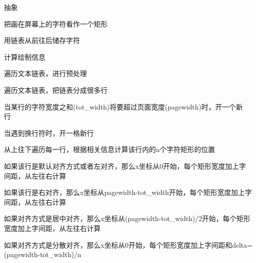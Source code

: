 \begin{DoxyEnumerate}
\item 抽象~\newline

\begin{DoxyItemize}
\item 把画在屏幕上的字符看作一个矩形~\newline

\item 用链表从前往后储存字符~\newline

\end{DoxyItemize}
\item 计算绘制信息~\newline

\begin{DoxyItemize}
\item 遍历文本链表，进行预处理~\newline

\item 遍历文本链表，把链表分成很多行~\newline

\begin{DoxyItemize}
\item 当某行的字符宽度之和({\ttfamily tot\+\_\+width})将要超过页面宽度({\ttfamily pagewidth})时，开一个新行~\newline

\item 当遇到换行符时，开一格新行~\newline

\end{DoxyItemize}
\item 从上往下遍历每一行，根据相关信息计算该行内的{\ttfamily n}个字符矩形的位置~\newline

\begin{DoxyItemize}
\item 如果该行是默认对齐方式或者左对齐，那么x坐标从0开始，每个矩形宽度加上字间距，从左往右计算~\newline

\item 如果该行是右对齐，那么x坐标从{\ttfamily pagewidth}-\/{\ttfamily tot\+\_\+width}开始，每个矩形宽度加上字间距，从左往右计算~\newline

\item 如果对齐方式是居中对齐，那么x坐标从({\ttfamily pagewidth}-\/{\ttfamily tot\+\_\+width})/2开始，每个矩形宽度加上字间距，从左往右计算~\newline

\item 如果对齐方式是分散对齐，那么x坐标从0开始，每个矩形宽度加上字间距和{\ttfamily delta}=({\ttfamily pagewidth}-\/{\ttfamily tot\+\_\+width})/{\ttfamily n}~\newline

\end{DoxyItemize}
\end{DoxyItemize}
\end{DoxyEnumerate}

